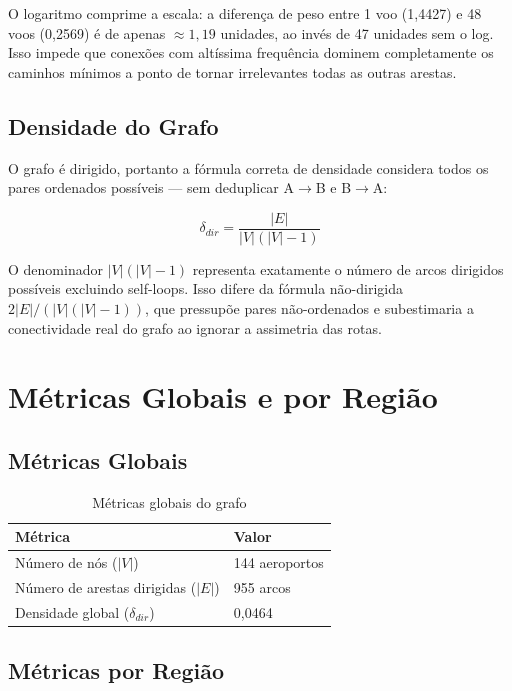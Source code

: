 \documentclass[12pt,a4paper]{article}
\begin{document}
O logaritmo comprime a escala: a diferença de peso entre 1 voo (1{,}4427) e 48 voos (0{,}2569)
é de apenas $\approx 1{,}19$ unidades, ao invés de 47 unidades sem o log. Isso impede que conexões
com altíssima frequência dominem completamente os caminhos mínimos a ponto de tornar irrelevantes
todas as outras arestas.

\subsection{Densidade do Grafo}

O grafo é dirigido, portanto a fórmula correta de densidade considera todos os pares ordenados
possíveis --- sem deduplicar A$\to$B e B$\to$A:

\begin{equation}
    \delta_{dir} = \frac{|E|}{|V|(|V|-1)}
    \label{eq:densidade}
\end{equation}

O denominador $|V|(|V|-1)$ representa exatamente o número de arcos dirigidos possíveis excluindo
self-loops. Isso difere da fórmula não-dirigida $2|E|/(|V|(|V|-1))$, que pressupõe pares
não-ordenados e subestimaria a conectividade real do grafo ao ignorar a assimetria das rotas.

\section{Métricas Globais e por Região}

\subsection{Métricas Globais}

\begin{table}[H]
\centering
\caption{Métricas globais do grafo}
\begin{tabular}{ll}
\toprule
\textbf{Métrica} & \textbf{Valor} \\
\midrule
Número de nós ($|V|$)               & 144 aeroportos \\
Número de arestas dirigidas ($|E|$)  & 955 arcos \\
Densidade global ($\delta_{dir}$)    & 0{,}0464 \\
\bottomrule
\end{tabular}
\end{table}

\subsection{Métricas por Região}
\end{document}
